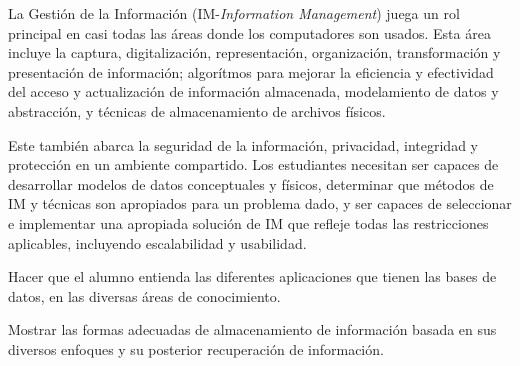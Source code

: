 \begin{syllabus}


\begin{justification}
La Gestión de la Información (IM-\textit{Information Management}) juega un rol principal en casi todas las áreas donde los computadores son usados. Esta área incluye la captura, digitalización, representación, organización, transformación y presentación de información; algorítmos para mejorar la eficiencia y efectividad del acceso y actualización de información almacenada, modelamiento de datos y abstracción, y técnicas de almacenamiento de archivos físicos.

Este también abarca la seguridad de la información, privacidad, integridad y protección en un ambiente compartido. Los estudiantes necesitan ser capaces de desarrollar modelos de datos conceptuales y físicos, determinar que métodos de IM y técnicas son apropiados para un problema dado, y ser capaces de seleccionar e implementar una apropiada solución de IM que refleje todas las restricciones aplicables, incluyendo escalabilidad y usabilidad.
\end{justification}

\begin{goals}
\item Hacer que el alumno entienda las diferentes aplicaciones que tienen las bases de datos, en las diversas áreas de conocimiento.
\item Mostrar las formas adecuadas de almacenamiento de información basada en sus diversos enfoques y su posterior recuperación de información.
\end{goals}

\begin{outcomes}
    \item {}
    \item {}
    \item {}
\end{outcomes}

\begin{competences}
    \item {} 
    \item {}
    \item {}
\end{competences}


\end{syllabus}
